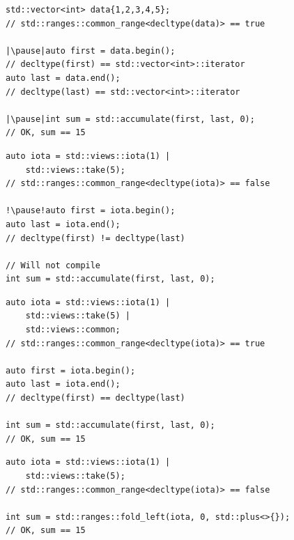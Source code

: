 \documentclass[aspectratio=169]{beamer}
\begin{document}
\begin{frame}[fragile,c]
\Large
\begin{center}
\begin{verbatim}
std::vector<int> data{1,2,3,4,5};
// std::ranges::common_range<decltype(data)> == true

|\pause|auto first = data.begin();
// decltype(first) == std::vector<int>::iterator
auto last = data.end();
// decltype(last) == std::vector<int>::iterator

|\pause|int sum = std::accumulate(first, last, 0);
// OK, sum == 15
\end{verbatim}
\end{center}
\let\thefootnote\relax{}
\end{frame}

\begin{frame}[fragile,c]
\Large
\begin{center}
\begin{verbatim}
auto iota = std::views::iota(1) | 
    std::views::take(5);
// std::ranges::common_range<decltype(iota)> == false

!\pause!auto first = iota.begin();
auto last = iota.end();
// decltype(first) != decltype(last)

// Will not compile
int sum = std::accumulate(first, last, 0);
\end{verbatim}
\end{center}
\let\thefootnote\relax{}
\end{frame}

\begin{frame}[fragile,c]
\Large
\begin{center}
\begin{verbatim}
auto iota = std::views::iota(1) | 
    std::views::take(5) |
    std::views::common;
// std::ranges::common_range<decltype(iota)> == true

auto first = iota.begin();
auto last = iota.end();
// decltype(first) == decltype(last)

int sum = std::accumulate(first, last, 0);
// OK, sum == 15
\end{verbatim}
\end{center}
\let\thefootnote\relax{}
\end{frame}

\begin{frame}[fragile,c]
\Large
\begin{center}
\begin{verbatim}
auto iota = std::views::iota(1) | 
    std::views::take(5);
// std::ranges::common_range<decltype(iota)> == false

int sum = std::ranges::fold_left(iota, 0, std::plus<>{});
// OK, sum == 15
\end{verbatim}
\end{center}
\let\thefootnote\relax{}
\end{frame}
\end{document}
